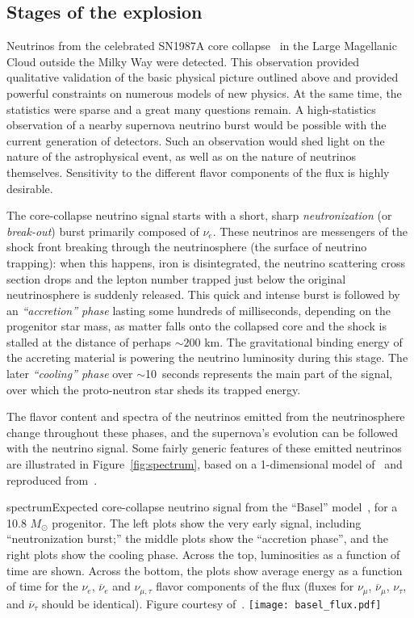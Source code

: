 \subsection{Stages of the explosion}

Neutrinos from the celebrated SN1987A core
collapse~\cite{Bionta:1987qt,Hirata:1987hu} in the Large Magellanic
Cloud outside the Milky Way were detected. This observation provided qualitative validation of the basic physical picture outlined above and provided powerful constraints on numerous models of new physics. At the same time, the
statistics 
were sparse 
and a great many questions remain.  A high-statistics observation of a
nearby supernova neutrino burst would be possible with the current
generation of detectors. Such an observation would shed light
on 
the nature of the astrophysical event, as well as on the nature of
neutrinos themselves.  Sensitivity to the different flavor components
of the flux is highly desirable.

The core-collapse neutrino signal starts with a short, sharp
\emph{neutronization} (or \emph{break-out}) burst primarily composed of
$\nu_e$. These neutrinos are messengers of the shock front breaking through the neutrinosphere (the surface of neutrino trapping): when this happens, iron is disintegrated, the neutrino scattering cross section drops and the lepton number trapped just below the original neutrinosphere is suddenly released. This quick and intense burst is followed by an
\emph{``accretion'' phase} lasting some hundreds of milliseconds, depending on the progenitor star mass, as matter falls onto the collapsed core and the shock is stalled at the distance of perhaps $\sim 200$ km. The gravitational binding energy of the accreting material is powering the neutrino luminosity during this stage. The later
\emph{``cooling'' phase} over $\sim$10~seconds represents the main part of
the signal, over which the proto-neutron star sheds its trapped energy.  

The flavor content and spectra of the neutrinos emitted from the neutrinosphere change
throughout these phases, and the supernova's evolution can
be followed with the neutrino signal. 
Some fairly generic features of these emitted neutrinos are illustrated in Figure~\ref{fig:spectrum}, based on a 1-dimensional model of~\cite{Fischer:2009af} and reproduced from~\cite{Wurm:2011zn}.
\begin{dunefigure}{spectrum}{Expected
  core-collapse neutrino signal from the ``Basel''
  model~\cite{Fischer:2009af}, for a
  10.8 $M_{\odot}$ progenitor.  The left plots show the very early
  signal, including ``neutronization burst;'' the middle plots show
  the ``accretion phase'', and the right plots show the cooling
  phase. Across the top, luminosities as a function of time are shown. 
  Across the bottom, the plots show average energy as a function of time for the
  $\nu_e$, $\overline{\nu}_e$ and $\nu_{\mu,\tau}$ flavor components of the
  flux (fluxes for $\nu_\mu$, $\overline{\nu}_\mu$, $\nu_\tau$,
  and $\overline{\nu}_\tau$ should be identical).  Figure courtesy of~\cite{Wurm:2011zn}.}
\texttt{[image: basel\_flux.pdf]}
\end{dunefigure}

